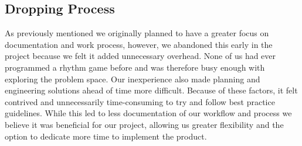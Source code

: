 \subsection{Dropping Process}
As previously mentioned we originally planned to have a greater focus on documentation and work process, however, we abandoned this early in the project because we felt it added unnecessary overhead. None of us had ever programmed a rhythm game before and was therefore busy enough with exploring the problem space. Our inexperience also made planning and engineering solutions ahead of time more difficult. Because of these factors, it felt contrived and unnecessarily time-consuming to try and follow best practice guidelines. While this led to less documentation of our workflow and process we believe it was beneficial for our project, allowing us greater flexibility and the option to dedicate more time to implement the product.